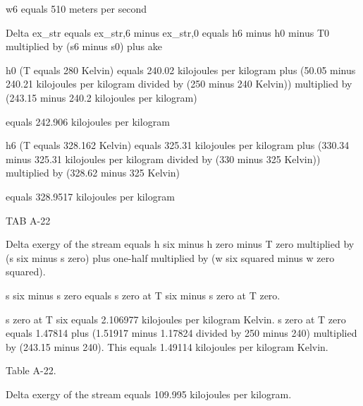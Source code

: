 w6 equals 510 meters per second  

Delta ex_str equals ex_str,6 minus ex_str,0  
equals h6 minus h0 minus T0 multiplied by (s6 minus s0) plus ake  

h0 (T equals 280 Kelvin) equals 240.02 kilojoules per kilogram plus (50.05 minus 240.21 kilojoules per kilogram divided by (250 minus 240 Kelvin)) multiplied by (243.15 minus 240.2 kilojoules per kilogram)  

equals 242.906 kilojoules per kilogram  

h6 (T equals 328.162 Kelvin) equals 325.31 kilojoules per kilogram plus (330.34 minus 325.31 kilojoules per kilogram divided by (330 minus 325 Kelvin)) multiplied by (328.62 minus 325 Kelvin)  

equals 328.9517 kilojoules per kilogram  

TAB A-22

Delta exergy of the stream equals h six minus h zero minus T zero multiplied by (s six minus s zero) plus one-half multiplied by (w six squared minus w zero squared).  

s six minus s zero equals s zero at T six minus s zero at T zero.  

s zero at T six equals 2.106977 kilojoules per kilogram Kelvin.  
s zero at T zero equals 1.47814 plus (1.51917 minus 1.17824 divided by 250 minus 240) multiplied by (243.15 minus 240).  
This equals 1.49114 kilojoules per kilogram Kelvin.  

Table A-22.  

Delta exergy of the stream equals 109.995 kilojoules per kilogram.